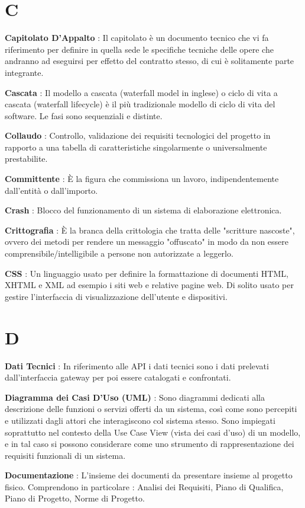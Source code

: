 \documentclass[12pt,a4paper,titlepage]{article}
\begin{document}
\section{C}
\begin{trivlist}
\item \textbf{Capitolato D'Appalto} : Il capitolato è un documento tecnico che vi fa riferimento per definire in quella sede le specifiche tecniche delle opere che andranno ad eseguirsi per effetto del contratto stesso, di cui è solitamente parte integrante.
\item \textbf{Cascata} : Il modello a cascata (waterfall model in inglese) o ciclo di vita a cascata (waterfall lifecycle) è il più tradizionale modello di ciclo di vita del software. Le fasi sono sequenziali e distinte.
\item \textbf{Collaudo} : Controllo, validazione dei requisiti tecnologici del progetto in rapporto a una tabella di caratteristiche singolarmente o universalmente prestabilite.
\item \textbf{Committente} : È la figura che commissiona un lavoro, indipendentemente dall'entità o dall'importo.
\item \textbf{Crash} : Blocco del funzionamento di un sistema di elaborazione elettronica.
\item \textbf{Crittografia} : È la branca della crittologia che tratta delle "scritture nascoste", ovvero dei metodi per rendere un messaggio "offuscato" in modo da non essere comprensibile/intelligibile a persone non autorizzate a leggerlo.
\item \textbf{CSS} : Un linguaggio usato per definire la formattazione di documenti HTML, XHTML e XML ad esempio i siti web e relative pagine web. Di solito usato per gestire l'interfaccia di visualizzazione dell'utente e dispositivi.
\end{trivlist}

\section{D}
\begin{trivlist}
\item \textbf{Dati Tecnici} : In riferimento alle API i dati tecnici sono i dati prelevati dall'interfaccia gateway per poi essere catalogati e confrontati.
\item \textbf{Diagramma dei Casi D'Uso (UML)} : Sono diagrammi dedicati alla descrizione delle funzioni o servizi offerti da un sistema, così come sono percepiti e utilizzati dagli attori che interagiscono col sistema stesso. Sono impiegati soprattutto nel contesto della Use Case View (vista dei casi d'uso) di un modello, e in tal caso si possono considerare come uno strumento di rappresentazione dei requisiti funzionali di un sistema.
\item \textbf{Documentazione} : L'insieme dei documenti da presentare insieme al progetto fisico. Comprendono in particolare : Analisi dei Requisiti, Piano di Qualifica, Piano di Progetto, Norme di Progetto.
\end{trivlist}
\end{document}
